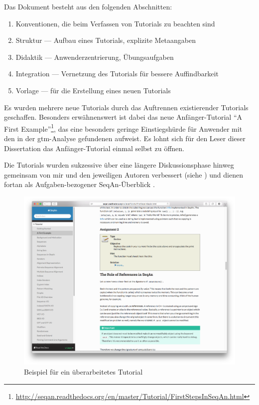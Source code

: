 Das Dokument besteht aus den folgenden Abschnitten:
\begin{enumerate}
\itemsep1pt\parskip0pt
  \item Konventionen, die beim Verfassen von Tutorials zu beachten sind
  \item Struktur --- Aufbau eines Tutorials, explizite Metaangaben
  \item Didaktik --- Anwenderzentrierung, Übungsaufgaben
  \item Integration --- Vernetzung des Tutorials für bessere Auffindbarkeit
  \item Vorlage --- für die Erstellung eines neuen Tutorials
\end{enumerate}

Es wurden mehrere neue Tutorials durch das Auftrennen existierender Tutorials geschaffen. Besonders erwähnenswert ist dabei das neue Anfänger-Tutorial ``A First Example''\footnote{\url{http://seqan.readthedocs.org/en/master/Tutorial/FirstStepsInSeqAn.html}}, das eine besonders geringe Einstiegshürde für Anwender mit den in der \gls{gtm}-Analyse gefundenen  aufweist. Es lohnt sich für den Leser dieser Dissertation das Anfänger-Tutorial einmal selbst zu öffnen.

Die Tutorials wurden sukzessive über eine längere Diskussionsphase hinweg gemeinsam von mir und den jeweiligen Autoren verbessert (siehe ) und dienen fortan als Aufgaben-bezogener SeqAn-Überblick \citep[vgl.][]{Fairbanks:2006jw,Ko:2011vw,Pugh:Ks4cicwp,Robillard:2009cs}.

\begin{figure}[ht!]
  \centering
    \includegraphics[width=1\linewidth]{Figures/tutorial-improved-final.png}
  \caption{Beispiel für ein überarbeitetes Tutorial}
  \label{fig:tutorial-improved-final}
\end{figure}





